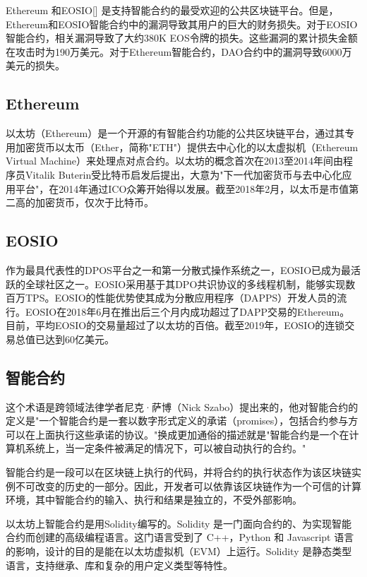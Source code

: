 \documentclass{SCIS2022cn}
\begin{document}
Ethereum\cite{1} 和EOSIO[]\cite{2} 是支持智能合约的最受欢迎的公共区块链平台。但是，Ethereum和EOSIO智能合约中的漏洞导致其用户的巨大的财务损失。对于EOSIO智能合约，相关漏洞导致了大约380K EOS令牌\cite{3}的损失。这些漏洞的累计损失金额在攻击时为190万美元。对于Ethereum智能合约，DAO合约中的漏洞\cite{4}导致6000万美元的损失。 

\subsection{Ethereum}

以太坊（Ethereum）是一个开源的有智能合约功能的公共区块链平台，通过其专用加密货币以太币（Ether，简称"ETH"）提供去中心化的以太虚拟机（Ethereum Virtual Machine）来处理点对点合约。以太坊的概念首次在2013至2014年间由程序员Vitalik Buterin受比特币启发后提出，大意为"下一代加密货币与去中心化应用平台"，在2014年通过ICO众筹开始得以发展。截至2018年2月，以太币是市值第二高的加密货币，仅次于比特币。

\subsection{EOSIO}

作为最具代表性的DPOS平台之一和第一分散式操作系统之一，EOSIO已成为最活跃的全球社区之一。EOSIO采用基于其DPO共识协议的多线程机制，能够实现数百万TPS。EOSIO的性能优势使其成为分散应用程序（DAPPS）开发人员的流行。EOSIO在2018年6月在推出后三个月内成功超过了DAPP交易的Ethereum\cite{5}。 目前，平均EOSIO的交易量超过了以太坊的百倍\cite{6}。截至2019年，EOSIO的连锁交易总值已达到60亿美元。

\subsection{智能合约}

这个术语是跨领域法律学者尼克·萨博（Nick Szabo）提出来的，他对智能合约的定义是"一个智能合约是一套以数字形式定义的承诺（promises），包括合约参与方可以在上面执行这些承诺的协议。"换成更加通俗的描述就是"智能合约是一个在计算机系统上，当一定条件被满足的情况下，可以被自动执行的合约。"

智能合约是一段可以在区块链上执行的代码，并将合约的执行状态作为该区块链实例不可改变的历史的一部分。因此，开发者可以依靠该区块链作为一个可信的计算环境，其中智能合约的输入、执行和结果是独立的，不受外部影响。

以太坊上智能合约是用Solidity编写的。Solidity 是一门面向合约的、为实现智能合约而创建的高级编程语言。这门语言受到了 C++，Python 和 Javascript 语言的影响，设计的目的是能在以太坊虚拟机（EVM）上运行。Solidity 是静态类型语言，支持继承、库和复杂的用户定义类型等特性。
\end{document}
